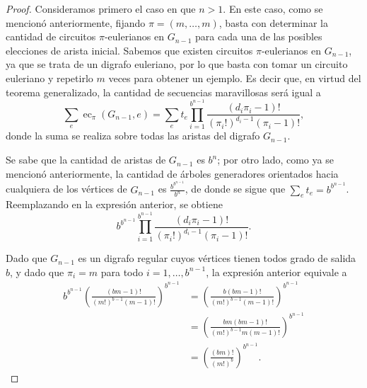\begin{proof}
	Consideramos primero el caso en que $n > 1$.
	En este caso, como se mencionó anteriormente, fijando $\pi = (m, \dots, m)$,
	basta con determinar la cantidad de circuitos $\pi$-eulerianos en $G_{n-1}$
	para cada una de las posibles elecciones de arista inicial.
	Sabemos que existen circuitos $\pi$-eulerianos en $G_{n-1}$, ya que se trata
	de un digrafo euleriano, por lo que basta con tomar un circuito euleriano y
	repetirlo $m$ veces para obtener un ejemplo.
	Es decir que, en virtud del teorema \BEST{} generalizado, la cantidad de
	secuencias maravillosas será igual a \[ \sum_e \operatorname{ec}_\pi(G_{n-1}, e) =
		\sum_e t_e \prod_{i=1}^{b^{n-1}} \frac{(d_i\pi_i - 1)!
		}{(\pi_i!)^{d_i-1}(\pi_i-1)!}, \] donde la suma se realiza sobre todas las
	aristas del digrafo $G_{n-1}$.

	Se sabe que la cantidad de aristas de $G_{n-1}$ es $b^n$; por otro lado,
	como ya se mencionó anteriormente, la
	cantidad de árboles generadores orientados hacia cualquiera de los vértices
	de $G_{n-1}$ es $\frac{b^{b^{n-1}}}{b^n}$, de donde se sigue que
	$\sum_{e} t_e = b^{b^{n-1}}$.
	Reemplazando en la expresión anterior, se obtiene \[ b^{b^{n-1}}
		\prod_{i=1}^{b^{n-1}} \frac{(d_i\pi_i - 1)! }{(\pi_i!)^{d_i-1}(\pi_i-1)!}.
	\]

	Dado que $G_{n-1}$ es un digrafo regular cuyos vértices tienen todos grado de
	salida $b$, y dado que $\pi_i = m$ para todo $i = 1, \dots, b^{n-1}$, la
	expresión anterior equivale a
	\begin{align*}
		b^{b^{n-1}} \left( \frac{(bm - 1)! }{(m!)^{b-1}(m-1)!} \right)^{b^{n-1}}
			&= \left( \frac{b (bm - 1)! }{(m!)^{b-1}(m-1)!} \right)^{b^{n-1}} \\
			&= \left( \frac{bm (bm - 1)! }{(m!)^{b-1}m(m-1)!} \right)^{b^{n-1}} \\
			&= \left( \frac{(bm)! }{(m!)^b} \right)^{b^{n-1}}.
	\end{align*}


\end{proof}
